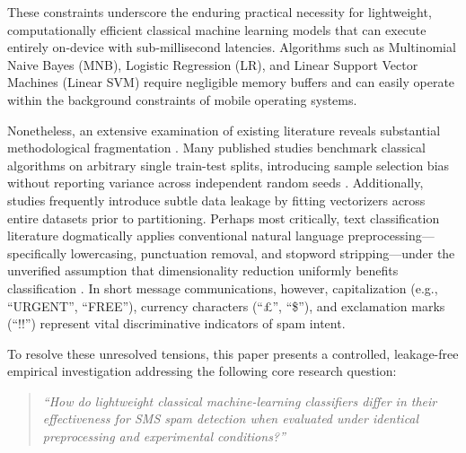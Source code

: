 \documentclass[conference]{IEEEtran}
\begin{document}
These constraints underscore the enduring practical necessity for lightweight, computationally efficient classical machine learning models that can execute entirely on-device with sub-millisecond latencies. Algorithms such as Multinomial Naive Bayes (MNB), Logistic Regression (LR), and Linear Support Vector Machines (Linear SVM) require negligible memory buffers and can easily operate within the background constraints of mobile operating systems.

Nonetheless, an extensive examination of existing literature reveals substantial methodological fragmentation \cite{alsaidat2024advancements}. Many published studies benchmark classical algorithms on arbitrary single train-test splits, introducing sample selection bias without reporting variance across independent random seeds \cite{wijaya2023spam}. Additionally, studies frequently introduce subtle data leakage by fitting vectorizers across entire datasets prior to partitioning. Perhaps most critically, text classification literature dogmatically applies conventional natural language preprocessing---specifically lowercasing, punctuation removal, and stopword stripping---under the unverified assumption that dimensionality reduction uniformly benefits classification \cite{yerima2022comparative}. In short message communications, however, capitalization (e.g., ``URGENT'', ``FREE''), currency characters (``\pounds'', ``\$''), and exclamation marks (``!!'') represent vital discriminative indicators of spam intent.

To resolve these unresolved tensions, this paper presents a controlled, leakage-free empirical investigation addressing the following core research question:
\begin{quote}
\textit{``How do lightweight classical machine-learning classifiers differ in their effectiveness for SMS spam detection when evaluated under identical preprocessing and experimental conditions?''}
\end{quote}
\end{document}
